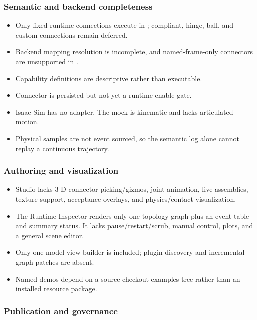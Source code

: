 \subsubsection{Semantic and backend completeness}

\begin{itemize}
  \item Only fixed runtime connections execute in \mujoco{}; compliant, hinge, ball,
        and custom connections remain deferred.
  \item Backend mapping resolution is incomplete, and named-frame-only connectors are
        unsupported in \mujoco{}.
  \item Capability definitions are descriptive rather than executable.
  \item Connector  is persisted but not yet a runtime enable gate.
  \item Isaac Sim has no adapter. The mock is kinematic and lacks articulated motion.
  \item Physical samples are not event sourced, so the semantic log alone cannot replay
        a continuous trajectory.
\end{itemize}

\subsubsection{Authoring and visualization}

\begin{itemize}
  \item Studio lacks 3-D connector picking/gizmos, joint animation, live assemblies,
        texture support, acceptance overlays, and physics/contact visualization.
  \item The Runtime Inspector renders only one topology graph plus an event table and
        summary status. It lacks pause/restart/scrub, manual control, plots, and a
        general scene editor.
  \item Only one model-view builder is included; plugin discovery and incremental graph
        patches are absent.
  \item Named demos depend on a source-checkout examples tree rather than an installed
        resource package.
\end{itemize}

\subsubsection{Publication and governance}

